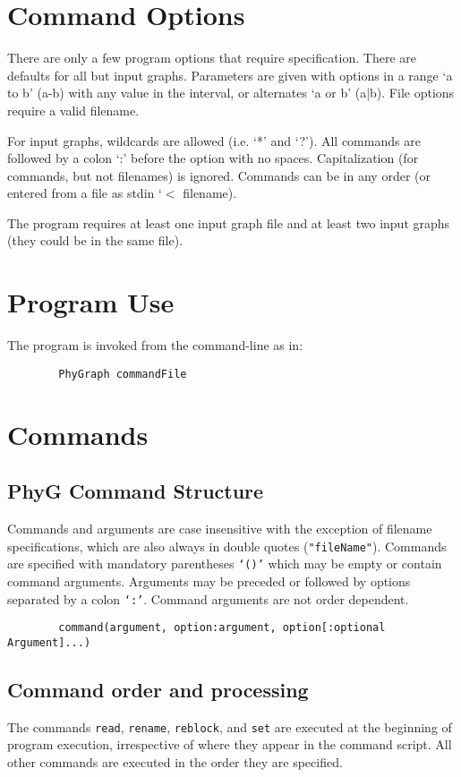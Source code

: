 \documentclass[11pt]{book}
\begin{document}
	\section{Command Options}
	There are only a few program options that require specification.  There are defaults for all but input
	graphs.  Parameters are given with options in a range `a to b' (a-b) with any value in the interval, or
	alternates `a or b' (a|b). File options require a valid filename.
	
	For input graphs, wildcards are allowed (i.e. `*' and `?').  All commands are followed by a colon `:' before the option with no spaces.  Capitalization (for commands, but not filenames) is ignored.  Commands can be in any order (or entered from a file as stdin `$<$ filename).
	
	The program requires at least one input graph file and at least two input graphs (they could be in the same file).
	
	
	\section{Program Use}
	The program is invoked from the command-line as in:
	\begin{verbatim}
		PhyGraph commandFile
	\end{verbatim}
	
	\section{Commands}
	\subsection{PhyG Command Structure}
	Commands and arguments are case insensitive with the exception of filename specifications, which are also 
	always in double quotes (\texttt{"fileName"}).  Commands are specified with mandatory parentheses \texttt{`()'} which may be empty or
	contain command arguments. Arguments may be preceded or followed by options separated by a colon \texttt{`:'}.  Command arguments are not order dependent.
	
	\begin{verbatim}
		command(argument, option:argument, option[:optional Argument]...)
	\end{verbatim}
	\subsection{Command order and processing}
	The commands \texttt{read}, \texttt{rename}, \texttt{reblock}, and \texttt{set} are executed at
	the beginning of program execution, irrespective of where they appear in the command script.  All other
	commands are executed in the order they are specified.
	
\end{document}
